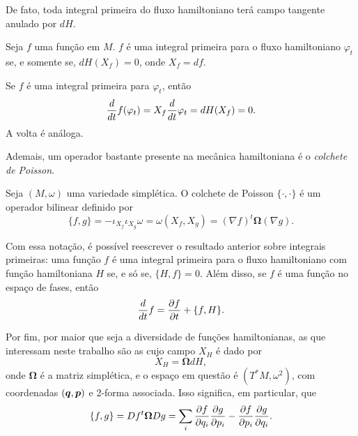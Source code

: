 De fato, toda integral primeira do fluxo hamiltoniano terá campo tangente anulado por $dH$.

\begin{proposition}
    Seja $f$ uma função em $M$. $f$ é uma integral primeira para o fluxo hamiltoniano $\varphi_t$ se, e somente se, $dH(X_f) = 0$, onde $X_f = df$.
\end{proposition}
\begin{Proof}
    Se $f$ é uma integral primeira para $\varphi_t$, então
    \begin{equation*}
        \dfrac{d }{d t} f(\varphi_t) = X_f \dfrac{d }{d t} \varphi_t = dH (X_f) = 0.
    \end{equation*}
    A volta é análoga.
\end{Proof}

Ademais, um operador bastante presente na mecânica hamiltoniana é o \textit{colchete de Poisson}.

\begin{definition}
    Seja $(M, \omega)$ uma variedade simplética. O colchete de Poisson $\{\cdot,\cdot\}$ é um operador bilinear definido por
    \begin{equation*}
        \{f, g\}
        = - \iota_{X_f} \iota_{X_g} \omega 
        = \omega(X_f, X_g)
        = (\nabla f)^t \bm \Omega (\nabla g).
    \end{equation*}
\end{definition}

Com essa notação, é possível reescrever o resultado anterior sobre integrais primeiras: uma função $f$ é uma integral primeira para o fluxo hamiltoniano com função hamiltoniana $H$ se, e só se, $\{H, f\} = 0$. Além disso, se $f$ é uma função no espaço de fases, então
\begin{equation*}
    \dfrac{d }{d t} f = \dfrac{\partial f}{\partial t} + \{f, H\}.
\end{equation*}

Por fim, por maior que seja a diversidade de funções hamiltonianas, as que interessam neste trabalho são as cujo campo $X_H$ é dado por
\begin{equation*}
    X_H = \bm \Omega dH,
\end{equation*}
onde $\bm \Omega$ é a matriz simplética, e o espaço em questão é $(T^*M, \omega^2)$, com coordenadas $(\bm q, \bm p)$ e 2-forma associada. Isso significa, em particular, que
\begin{equation*}
    \{f, g\} = Df^t \bm \Omega Dg = \sum_i \dfrac{\partial f}{\partial q_i}\dfrac{\partial g}{\partial p_i} - \dfrac{\partial f}{\partial p_i}\dfrac{\partial g}{\partial q_i}.
\end{equation*}

